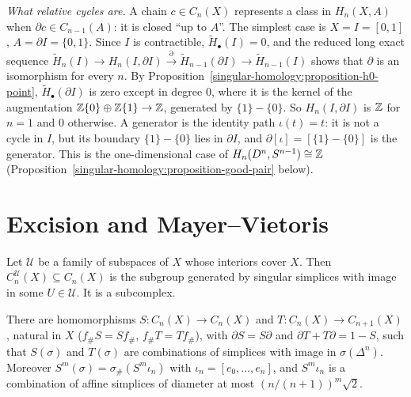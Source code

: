 \begin{example}\label{singular-homology:example-interval}
\emph{What relative cycles are.} A chain $c \in C_n(X)$ represents a class in $H_n(X, A)$ when $\partial c \in C_{n-1}(A)$: it is closed ``up to $A$''. The simplest case is
$X = I = [0, 1]$, $A = \partial I = \{0, 1\}$. Since $I$ is contractible, $\tilde{H}_\bullet(I) = 0$, and the reduced long exact sequence
$\tilde{H}_n(I) \to H_n(I, \partial I) \xrightarrow{\partial} \tilde{H}_{n-1}(\partial I) \to \tilde{H}_{n-1}(I)$ shows that $\partial$ is an isomorphism for every $n$. By
Proposition~\ref{singular-homology:proposition-h0-point}, $\tilde{H}_\bullet(\partial I)$ is zero except in degree $0$, where it is the kernel of the augmentation
$\mathbb{Z}\{0\} \oplus \mathbb{Z}\{1\} \to \mathbb{Z}$, generated by $\{1\} - \{0\}$. So $H_n(I, \partial I)$ is $\mathbb{Z}$ for $n = 1$ and $0$ otherwise. A generator is the identity path
$\iota(t) = t$: it is not a cycle in $I$, but its boundary $\{1\} - \{0\}$ lies in $\partial I$, and $\partial[\iota] = [\{1\} - \{0\}]$ is the generator. This is the
one-dimensional case of $H_n(D^n, S^{n-1}) \cong \mathbb{Z}$ (Proposition~\ref{singular-homology:proposition-good-pair} below).
\end{example}

\section{Excision and Mayer--Vietoris}\label{singular-homology:section-excision}

\begin{definition}\label{singular-homology:definition-small-chains}
Let $\mathcal{U}$ be a family of subspaces of $X$ whose interiors cover $X$. Then $C^{\mathcal{U}}_n(X) \subseteq C_n(X)$ is the subgroup generated by singular
simplices with image in some $U \in \mathcal{U}$. It is a subcomplex.
\end{definition}

\begin{lemma}\label{singular-homology:lemma-subdivision}
There are homomorphisms $S \colon C_n(X) \to C_n(X)$ and $T \colon C_n(X) \to C_{n+1}(X)$, natural in $X$ ($f_\#S = Sf_\#$, $f_\#T = Tf_\#$), with
$\partial S = S\partial$ and $\partial T + T\partial = 1 - S$, such that $S(\sigma)$ and $T(\sigma)$ are combinations of simplices with image in $\sigma(\Delta^n)$.
Moreover $S^m(\sigma) = \sigma_\#(S^m\iota_n)$ with $\iota_n = [e_0, \ldots, e_n]$, and $S^m\iota_n$ is a combination of affine simplices of diameter at most
$(n/(n+1))^m\sqrt{2}$.
\end{lemma}

